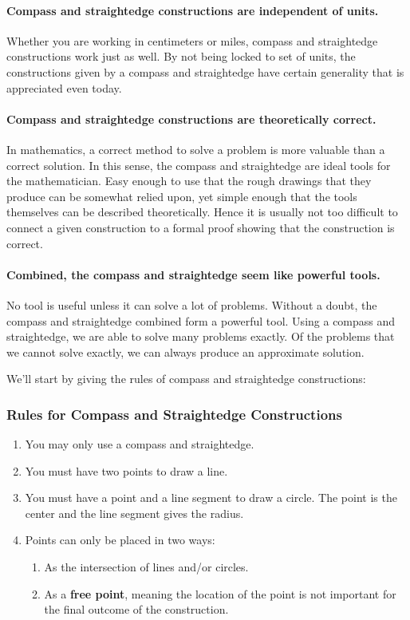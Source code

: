 \paragraph{Compass and straightedge constructions are \textbf{independent of units}.} 
Whether you are working in centimeters or miles, compass and
straightedge constructions work just as well. By not being locked to
set of units, the constructions given by a compass and straightedge
have certain generality that is appreciated even today.


\paragraph{Compass and straightedge constructions are \textbf{theoretically correct}.} 
In mathematics, a correct method to solve a problem is more valuable
than a correct solution. In this sense, the compass and straightedge
are ideal tools for the mathematician. Easy enough to use that the
rough drawings that they produce can be somewhat relied upon, yet
simple enough that the tools themselves can be described
theoretically. Hence it is usually not too difficult to connect a
given construction to a formal proof showing that the construction is
correct.


\paragraph{Combined, the compass and straightedge seem like \textbf{powerful tools}.} 
No tool is useful unless it can solve a lot of problems. Without a
doubt, the compass and straightedge combined form a powerful
tool. Using a compass and straightedge, we are able to solve many
problems exactly. Of the problems that we cannot solve exactly, we can
always produce an approximate solution.





 We'll start by giving the rules of compass and
straightedge constructions:

\subsubsection*{Rules for Compass and Straightedge Constructions}
\begin{enumerate}
\item You may only use a compass and straightedge.
\item You must have two points to draw a line.
\item You must have a point and a line segment to draw a circle. The
  point is the center and the line segment gives the radius.
\item Points can only be placed in two ways:
\begin{enumerate}
\item As the intersection of lines and/or circles.
\item As a \textbf{free point}, meaning the location
  of the point is not important for the final outcome of the
  construction.
\end{enumerate}
\end{enumerate}

